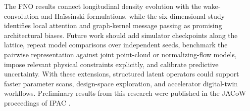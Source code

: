 The FNO results connect longitudinal density evolution with the wake-convolution and Haïssinski formulations, while the six-dimensional study identifies local attention and graph-kernel message passing as promising architectural biases. Future work should add simulator checkpoints along the lattice, repeat model comparisons over independent seeds, benchmark the pairwise representation against joint point-cloud or normalizing-flow models, impose relevant physical constraints explicitly, and calibrate predictive uncertainty. With these extensions, structured latent operators could support faster parameter scans, design-space exploration, and accelerator digital-twin workflows. Preliminary results from this research were published in the JACoW proceedings of IPAC \cite{ghribi2026updates}.

